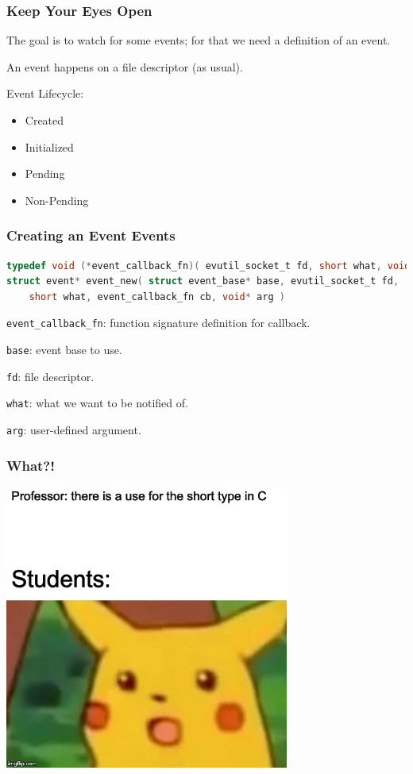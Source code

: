 \begin{frame}
	\frametitle{Keep Your Eyes Open}

	The goal is to watch for some events; for that we need a definition of an event.

	An event happens on a file descriptor (as usual).

	Event Lifecycle:\begin{itemize}
		\item Created
		\item Initialized
		\item Pending
		\item Non-Pending
	\end{itemize}

\end{frame}


\begin{frame}[fragile]
	\frametitle{Creating an Event Events}

	\begin{lstlisting}[language=C]
typedef void (*event_callback_fn)( evutil_socket_t fd, short what, void* arg )
struct event* event_new( struct event_base* base, evutil_socket_t fd, 
    short what, event_callback_fn cb, void* arg )
\end{lstlisting}


	\texttt{event\_callback\_fn}: function signature definition for callback.

	\texttt{base}: event base to use.

	\texttt{fd}: file descriptor.

	\texttt{what}: what we want to be notified of.

	\texttt{arg}: user-defined argument.

\end{frame}


\begin{frame}
	\frametitle{What?!}

	\begin{center}
		\includegraphics[width=0.7\textwidth]{images/short.jpg}
	\end{center}

\end{frame}


